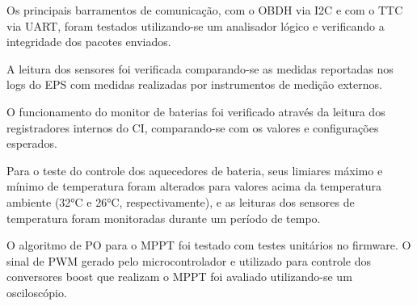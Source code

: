 Os principais barramentos de comunicação, com o \gls{OBDH} via \gls{I2C} e com o \gls{TTC} via \gls{UART}, foram testados utilizando-se um analisador lógico e verificando a integridade dos pacotes enviados.

A leitura dos sensores foi verificada comparando-se as medidas reportadas nos logs do \gls{EPS} com medidas realizadas por instrumentos de medição externos.

O funcionamento do monitor de baterias foi verificado através da leitura dos registradores internos do \gls{CI}, comparando-se com os valores e configurações esperados.

Para o teste do controle dos aquecedores de bateria, seus limiares máximo e mínimo de temperatura foram alterados para valores acima da temperatura ambiente (32°C e 26°C, respectivamente), e as leituras dos sensores de temperatura foram monitoradas durante um período de tempo.

O algoritmo de \gls{PO} para o \gls{MPPT} foi testado com testes unitários no firmware.
O sinal de \gls{PWM} gerado pelo microcontrolador e utilizado para controle dos conversores boost que realizam o \gls{MPPT} foi avaliado utilizando-se um osciloscópio.